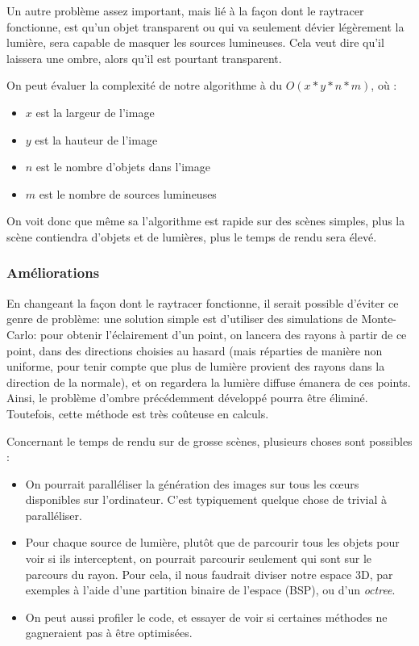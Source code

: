 \documentclass[a4paper]{article}
\begin{document}
    Un autre problème assez important, mais lié à la façon dont le raytracer fonctionne, est qu'un objet transparent ou qui va seulement
    dévier légèrement la lumière, sera capable de masquer les sources lumineuses.
    Cela veut dire qu'il laissera une ombre, alors qu'il est pourtant transparent.

    On peut évaluer la complexité de notre algorithme à du $O(x*y*n*m)$, où :
    \begin{itemize}
        \item $x$ est la largeur de l'image
        \item $y$ est la hauteur de l'image
        \item $n$ est le nombre d'objets dans l'image
        \item $m$ est le nombre de sources lumineuses
    \end{itemize}
    On voit donc que même sa l'algorithme est rapide sur des scènes simples, plus la scène contiendra d'objets et de lumières, plus le temps de rendu sera élevé.

    \subsubsection{Améliorations}

    En changeant la façon dont le raytracer fonctionne, il serait possible d'éviter ce genre de problème: une solution simple est d'utiliser
    des simulations de Monte-Carlo:
    pour obtenir l'éclairement d'un point, on lancera des rayons à partir de ce point, dans des directions choisies au hasard (mais réparties de manière non
    uniforme, pour tenir compte que plus de lumière provient des rayons dans la direction de la normale), et on regardera la lumière diffuse émanera de ces points.
    Ainsi, le problème d'ombre précédemment développé pourra être éliminé.
    Toutefois, cette méthode est très coûteuse en calculs.

    Concernant le temps de rendu sur de grosse scènes, plusieurs choses sont possibles :
    \begin{itemize}
        \item On pourrait paralléliser la génération des images sur tous les cœurs disponibles sur l'ordinateur. C'est typiquement quelque chose de trivial à paralléliser.
        \item Pour chaque source de lumière, plutôt que de parcourir tous les objets pour voir si ils interceptent, on pourrait parcourir seulement qui sont sur le parcours du rayon.
              Pour cela, il nous faudrait diviser notre espace 3D, par exemples à l'aide d'une partition binaire de l'espace (BSP), ou d'un \textit{octree}.
        \item On peut aussi profiler le code, et essayer de voir si certaines méthodes ne gagneraient pas à être optimisées.
    \end{itemize}
\end{document}
